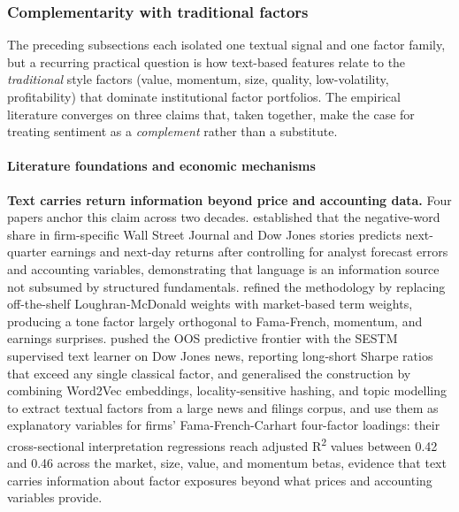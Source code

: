 \subsubsection{Complementarity with traditional factors}

The preceding subsections each isolated one textual signal and one factor family, but a recurring practical question is how text-based features relate to the \textit{traditional} style factors (value, momentum, size, quality, low-volatility, profitability) that dominate institutional factor portfolios. The empirical literature converges on three claims that, taken together, make the case for treating sentiment as a \textit{complement} rather than a substitute.

\paragraph{Literature foundations and economic mechanisms}

\textbf{Text carries return information beyond price and accounting data.} Four papers anchor this claim across two decades. \cite{tetlock2008more} established that the negative-word share in firm-specific Wall Street Journal and Dow Jones stories predicts next-quarter earnings and next-day returns after controlling for analyst forecast errors and accounting variables, demonstrating that language is an information source not subsumed by structured fundamentals. \cite{jegadeesh2013word} refined the methodology by replacing off-the-shelf Loughran-McDonald weights with market-based term weights, producing a tone factor largely orthogonal to Fama-French, momentum, and earnings surprises. \cite{ke2019predicting} pushed the OOS predictive frontier with the SESTM supervised text learner on Dow Jones news, reporting long-short Sharpe ratios that exceed any single classical factor, and \cite{cong2019textual} generalised the construction by combining Word2Vec embeddings, locality-sensitive hashing, and topic modelling to extract textual factors from a large news and filings corpus, and use them as explanatory variables for firms' Fama-French-Carhart four-factor loadings: their cross-sectional interpretation regressions reach adjusted R\textsuperscript{2} values between 0.42 and 0.46 across the market, size, value, and momentum betas, evidence that text carries information about factor exposures beyond what prices and accounting variables provide.

